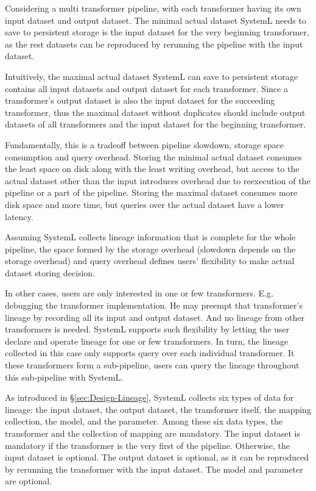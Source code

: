\documentclass{sig-alternate}
\begin{document}
Considering a multi transformer pipeline, with each transformer having its own input dataset and output dataset.
The minimal actual dataset SystemL needs to save to persistent storage is the input dataset for the very beginning transformer, as
the rest datasets can be reproduced by rerunning the pipeline with the input dataset.

Intuitively, the maximal actual dataset SystemL can save to persistent storage contains all input datasets and output dataset for each transformer.
Since a transformer's output dataset is also the input dataset for the succeeding transformer, thus the maximal dataset without duplicates
should include output datasets of all transformers and the input dataset for the beginning transformer. 

Fundamentally, this is a tradeoff between pipeline slowdown, storage space consumption and query overhead. 
Storing the minimal actual dataset consumes the least space on disk along with the least writing overhead, 
but access to the actual dataset other than the input introduces overhead due to reexecution of the pipeline or a part of the pipeline.
Storing the maximal dataset consumes more disk space and more time, but queries over the actual dataset
have a lower latency.

Assuming SystemL collects lineage information that is complete for the whole pipeline, the space formed by the storage overhead 
(slowdown depends on the storage overhead) and query overhead defines users' flexibility to make actual dataset storing decision.

In other cases, users are only interested in one or few transformers. E.g. debugging the transformer implementation.
He may preempt that transformer's lineage by recording all its input and output dataset. 
And no lineage from other transformers is needed.
SystemL supports such flexibility by letting the user declare and operate lineage for one or few transformers.
In turn, the lineage collected in this case only supports query over each individual transformer.
It these transformers form a sub-pipeline, users can query the lineage throughout this sub-pipeline with SystemL.

As introduced in \S\ref{sec:Design-Lineage}, SystemL collects six types of data for lineage: the input dataset, the output dataset,
the transformer itself, the mapping collection, the model, and the parameter.
Among these six data types, the transformer and the collection of mapping are mandatory. 
The input dataset is mandatory if the transformer is the very first of the pipeline. 
Otherwise, the input dataset is optional.
The output dataset is optional, as it can be reproduced by rerunning the transformer with the input dataset.
The model and parameter are optional.
\end{document}
